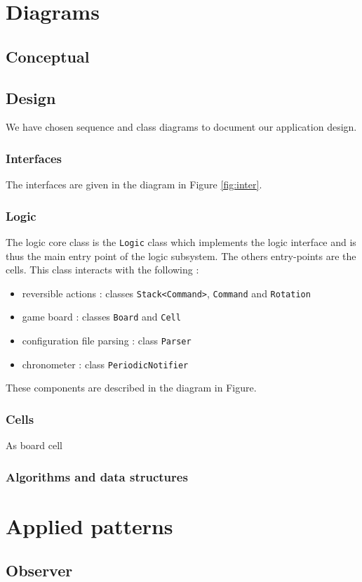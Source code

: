 \documentclass[a4paper,11pt]{article}
\begin{document}
\section{Diagrams}
\label{sec:diagrams}
\subsection{Conceptual}
\subsection{Design}
We have chosen sequence and class diagrams to document our application design. 
\subsubsection{Interfaces}
The interfaces are given in the diagram in Figure \ref{fig:inter}.
\subsubsection{Logic}
The logic core class is the \texttt{Logic} class which implements the logic interface and is thus the main entry point of the logic subsystem. The others entry-points are the cells. This class interacts with the following :
\begin{itemize}
	\item reversible actions : classes \texttt{Stack<Command>}, \texttt{Command} and \texttt{Rotation} 
	\item game board : classes \texttt{Board} and \texttt{Cell}
	\item configuration file parsing : class \texttt{Parser}
	\item chronometer : class \texttt{PeriodicNotifier}
\end{itemize}
These components are described in the diagram in Figure.
\subsubsection{Cells}
As board cell
\subsubsection{Algorithms and data structures}
\section{Applied patterns}
\subsection{Observer}
\end{document}

